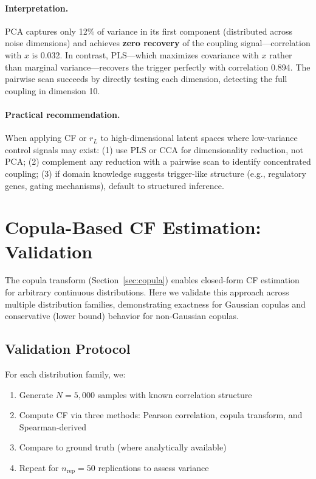 \documentclass[10pt]{article} %
\theoremstyle{plain}
\theoremstyle{definition}
\begin{document}
\paragraph{Interpretation.} PCA captures only 12\% of variance in its first component (distributed across noise dimensions) and achieves \textbf{zero recovery} of the coupling signal---correlation with $x$ is 0.032. In contrast, PLS---which maximizes covariance with $x$ rather than marginal variance---recovers the trigger perfectly with correlation 0.894. The pairwise scan succeeds by directly testing each dimension, detecting the full coupling in dimension 10.

\paragraph{Practical recommendation.} When applying CF or $r_L$ to high-dimensional latent spaces where low-variance control signals may exist: (1) use PLS or CCA for dimensionality reduction, not PCA; (2) complement any reduction with a pairwise scan to identify concentrated coupling; (3) if domain knowledge suggests trigger-like structure (e.g., regulatory genes, gating mechanisms), default to structured inference.

\section{Copula-Based CF Estimation: Validation}
\label{app:copula}

The copula transform (Section~\ref{sec:copula}) enables closed-form CF estimation for arbitrary continuous distributions. Here we validate this approach across multiple distribution families, demonstrating exactness for Gaussian copulas and conservative (lower bound) behavior for non-Gaussian copulas.

\subsection{Validation Protocol}

For each distribution family, we:
\begin{enumerate}[nosep]
    \item Generate $N = 5{,}000$ samples with known correlation structure
    \item Compute CF via three methods: Pearson correlation, copula transform, and Spearman-derived
    \item Compare to ground truth (where analytically available)
    \item Repeat for $n_{\text{rep}} = 50$ replications to assess variance
\end{enumerate}
\end{document}
